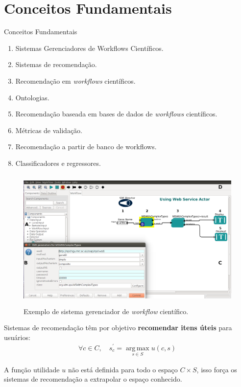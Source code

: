 \section{Conceitos Fundamentais}

\begin{frame}
	\begin{block}{Conceitos Fundamentais}
		 \begin{enumerate}
		  \item Sistemas Gerenciadores de Workflows Científicos.
		  \item Sistemas de recomendação.
		  \item Recomendação em \emph{workflows} científicos.
		  \item Ontologias.
		  \item Recomendação baseada em bases de dados de \emph{workflows} científicos.
		  \item Métricas de validação.
		  \item Recomendação a partir de banco de workflows.
		  \item Classificadores e regressores.
		 \end{enumerate}
	\end{block}
\end{frame}


\begin{frame}
	\begin{figure}[!htb]
		\centering	  				
		\includegraphics[height=7cm]{./secoes/ConceitosFundamentais/webService.png}
		\caption{Exemplo de sistema gerenciador de \emph{workflow} científico.}
		\label{fig_sistema_gerenciador_workflow_cientifico}
 	\end{figure}
\end{frame}


\begin{frame}		
	\begin{block}{}
		Sistemas de recomendação têm por objetivo \textbf{recomendar itens úteis} para usuários:
		\begin{eqnarray}
		\forall c \in C,  \quad s_{c}^{'} =  \operatorname*{arg\,max}_{s \in S} u(c,s) \label{formalizar_recomendacao}
		\end{eqnarray}
		
		A função utilidade \(u\) não está definida para todo o espaço \(C \times S\), isso força os sistemas de recomendação a extrapolar o espaço conhecido.
	\end{block}
\end{frame}


